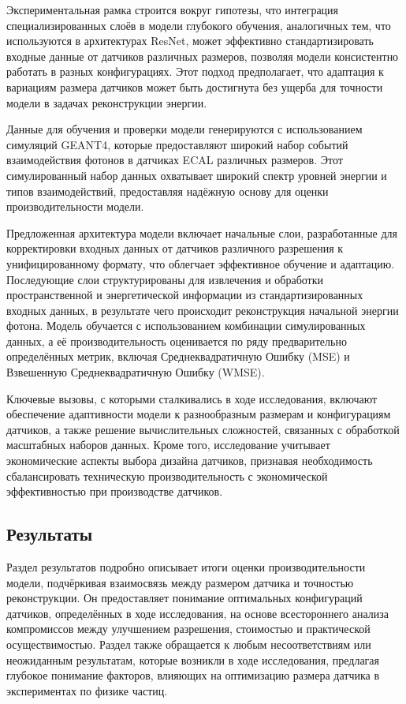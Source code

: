 \documentclass[a4paper,12pt]{extarticle}
\begin{document}
Экспериментальная рамка строится вокруг гипотезы, что интеграция специализированных слоёв в модели глубокого обучения, аналогичных тем, что используются в архитектурах ResNet, может эффективно стандартизировать входные данные от датчиков различных размеров, позволяя модели консистентно работать в разных конфигурациях. Этот подход предполагает, что адаптация к вариациям размера датчиков может быть достигнута без ущерба для точности модели в задачах реконструкции энергии.

Данные для обучения и проверки модели генерируются с использованием симуляций GEANT4, которые предоставляют широкий набор событий взаимодействия фотонов в датчиках ECAL различных размеров. Этот симулированный набор данных охватывает широкий спектр уровней энергии и типов взаимодействий, предоставляя надёжную основу для оценки производительности модели.

Предложенная архитектура модели включает начальные слои, разработанные для корректировки входных данных от датчиков различного разрешения к унифицированному формату, что облегчает эффективное обучение и адаптацию. Последующие слои структурированы для извлечения и обработки пространственной и энергетической информации из стандартизированных входных данных, в результате чего происходит реконструкция начальной энергии фотона. Модель обучается с использованием комбинации симулированных данных, а её производительность оценивается по ряду предварительно определённых метрик, включая Среднеквадратичную Ошибку (MSE) и Взвешенную Среднеквадратичную Ошибку (WMSE).

Ключевые вызовы, с которыми сталкивались в ходе исследования, включают обеспечение адаптивности модели к разнообразным размерам и конфигурациям датчиков, а также решение вычислительных сложностей, связанных с обработкой масштабных наборов данных. Кроме того, исследование учитывает экономические аспекты выбора дизайна датчиков, признавая необходимость сбалансировать техническую производительность с экономической эффективностью при производстве датчиков.

\subsection{Результаты}
\label{main_body:results}

Раздел результатов подробно описывает итоги оценки производительности модели, подчёркивая взаимосвязь между размером датчика и точностью реконструкции. Он предоставляет понимание оптимальных конфигураций датчиков, определённых в ходе исследования, на основе всестороннего анализа компромиссов между улучшением разрешения, стоимостью и практической осуществимостью. Раздел также обращается к любым несоответствиям или неожиданным результатам, которые возникли в ходе исследования, предлагая глубокое понимание факторов, влияющих на оптимизацию размера датчика в экспериментах по физике частиц.
\end{document}
